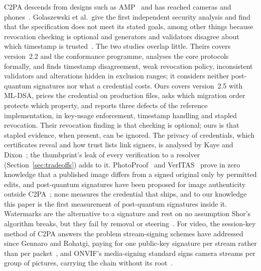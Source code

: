 C2PA descends from designs such as AMP~\cite{england2021amp} and has reached
cameras and phones~\cite{cai2023leica,sony2024c2pa,samsung2025s25,%
google2025pixel}. Golaszewski et al.\ give the first independent security
analysis and find that the specification does not meet its stated goals,
among other things because revocation checking is optional and generators and
validators disagree about which timestamp is trusted~\cite{%
golaszewski2026eprint,golaszewski2026}. The two studies overlap little.
Theirs covers version~2.2 and the conformance programme, analyses the core
protocols formally, and finds timestamp disagreement, weak revocation policy,
inconsistent validators and alterations hidden in exclusion ranges; it
considers neither post-quantum signatures nor what a credential costs. Ours
covers version~2.5 with ML-DSA, prices the credential on production files,
asks which migration order protects which property, and reports three
defects of the reference implementation, in key-usage enforcement, timestamp
handling and stapled revocation. Their revocation finding is that checking is
optional; ours is that stapled evidence, when present, can be ignored. The privacy
of credentials, which certificates reveal and how trust lists link signers, is
analysed by Kaye and Dixon~\cite{kaye2025privacy}; the thumbprint's leak of
every verification to a resolver (Section~\ref{sec:tradeoffs}) adds to it.
PhotoProof~\cite{naveh2016photoproof} and VerITAS~\cite{datta2025veritas}
prove in zero knowledge that a published image differs from a signed original
only by permitted edits, and post-quantum signatures have been proposed for
image authenticity outside C2PA~\cite{iavich2025pqveritas,%
alkhatib2025deepfake}; none measures the credential that ships, and to our
knowledge this paper is the first measurement of post-quantum signatures
inside it. Watermarks are the alternative to a signature and rest on no
assumption Shor's algorithm breaks, but they fail by removal or
steering~\cite{chandra2024nist,zhao2024invisible}. For video, the
session-key method of C2PA answers the problem stream-signing schemes have
addressed since Gennaro and Rohatgi, paying for one public-key signature per
stream rather than per packet~\cite{gennaro1997streams,perrig2000tesla}, and
ONVIF's media-signing standard signs camera streams per group of pictures,
carrying the chain without its root~\cite{onvif2026mediasigning}.
